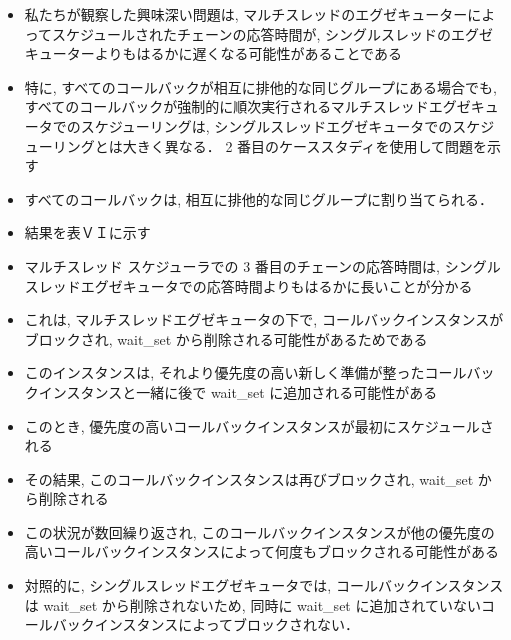 \begin{frame}{}
    \begin{itemize}
        \item 私たちが観察した興味深い問題は, マルチスレッドのエグゼキューターによってスケジュールされたチェーンの応答時間が, シングルスレッドのエグゼキューターよりもはるかに遅くなる可能性があることである
\item 特に, すべてのコールバックが相互に排他的な同じグループにある場合でも, すべてのコールバックが強制的に順次実行されるマルチスレッドエグゼキュータでのスケジューリングは, シングルスレッドエグゼキュータでのスケジューリングとは大きく異なる． 2 番目のケーススタディを使用して問題を示す
\item すべてのコールバックは, 相互に排他的な同じグループに割り当てられる．
    \end{itemize}
\end{frame}

\begin{frame}{}
    \begin{itemize}
        \item 結果を表ＶＩに示す
\item マルチスレッド スケジューラでの 3 番目のチェーンの応答時間は, シングルスレッドエグゼキュータでの応答時間よりもはるかに長いことが分かる
\item これは, マルチスレッドエグゼキュータの下で, コールバックインスタンスがブロックされ, wait\_set から削除される可能性があるためである
\item このインスタンスは, それより優先度の高い新しく準備が整ったコールバックインスタンスと一緒に後で wait\_set に追加される可能性がある
\item このとき, 優先度の高いコールバックインスタンスが最初にスケジュールされる
\item その結果, このコールバックインスタンスは再びブロックされ, wait\_set から削除される
\item この状況が数回繰り返され, このコールバックインスタンスが他の優先度の高いコールバックインスタンスによって何度もブロックされる可能性がある
\item 対照的に, シングルスレッドエグゼキュータでは, コールバックインスタンスは wait\_set から削除されないため, 同時に wait\_set に追加されていないコールバックインスタンスによってブロックされない．
    \end{itemize}
\end{frame}

